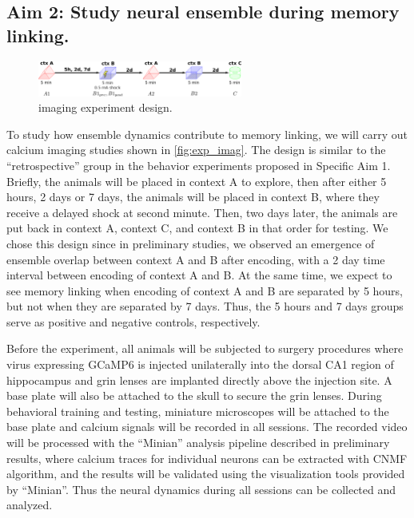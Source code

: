 \documentclass[master.tex]{subfiles}
\begin{document}
\subsection*{Aim 2: Study neural ensemble during memory linking.}


\begin{figure}
  \centering \includegraphics[width=0.6\textwidth]{Figures/exp_imag.pdf}
  \caption{\footnotesize imaging experiment design.}
  \label{fig:exp_imag}
\end{figure}

To study how ensemble dynamics contribute to memory linking, we will carry out
calcium imaging studies shown in \autoref{fig:exp_imag}. The design is similar
to the ``retrospective'' group in the behavior experiments proposed in Specific
Aim 1. Briefly, the animals will be placed in context A to explore, then after
either 5 hours, 2 days or 7 days, the animals will be placed in context B, where
they receive a delayed shock at second minute. Then, two days later, the animals
are put back in context A, context C, and context B in that order for testing.
We chose this design since in preliminary studies, we observed an emergence of
ensemble overlap between context A and B after encoding, with a 2 day time
interval between encoding of context A and B. At the same time, we expect to see
memory linking when encoding of context A and B are separated by 5 hours, but
not when they are separated by 7 days. Thus, the 5 hours and 7 days groups serve
as positive and negative controls, respectively.

Before the experiment, all animals will be subjected to surgery procedures where
virus expressing GCaMP6 is injected unilaterally into the dorsal CA1 region of
hippocampus and grin lenses are implanted directly above the injection site. A
base plate will also be attached to the skull to secure the grin lenses. During
behavioral training and testing, miniature microscopes will be attached to the
base plate and calcium signals will be recorded in all sessions. The recorded
video will be processed with the ``Minian'' analysis pipeline described in
preliminary results, where calcium traces for individual neurons can be
extracted with CNMF algorithm, and the results will be validated using the
visualization tools provided by ``Minian''. Thus the neural dynamics during all
sessions can be collected and analyzed.
\end{document}
